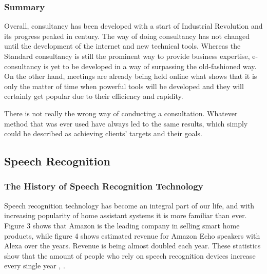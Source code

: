 \documentclass{article}
\begin{document}
\subsubsection{Summary}
{\large
Overall, consultancy has been developed with a start of Industrial Revolution and its progress peaked in  century. The way of doing consultancy has not changed until the development of the internet and new technical tools. Whereas the Standard consultancy is still the prominent way to provide business expertise, e-consultancy is yet to be developed in a way of surpassing the old-fashioned way. On the other hand, meetings are already being held online what shows that it is only the matter of time when powerful tools will be developed and they will certainly get popular due to their efficiency and rapidity.\par

There is not really the wrong way of conducting a consultation. Whatever method that was ever used have always led to the same results, which simply could be described as achieving clients' targets and their goals.\par
}

\subsection{Speech Recognition}
\subsubsection{The History of Speech Recognition Technology}
\label{sec:dragon}
{\large
Speech recognition technology has become an integral part of our life, and with increasing popularity of home assistant systems it is more familiar than ever. Figure 3 shows that Amazon is the leading company in selling smart home products, while figure 4 shows estimated revenue for Amazon Echo speakers with Alexa over the years. Revenue is being almost doubled each year. These statistics show that the amount of people who rely on speech recognition devices increase every single year \parencite{amazonrules}, \parencite{alexastats}.\par
}
\end{document}
